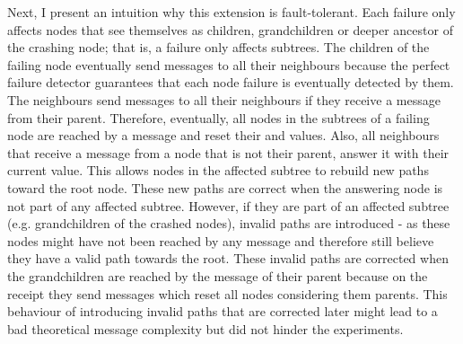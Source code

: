 Next, I present an intuition why this extension is fault-tolerant.
Each failure only affects nodes that see themselves as children, grandchildren or deeper ancestor of the crashing node; that is, a failure only affects subtrees.
The children of the failing node eventually send  messages to all their neighbours because the perfect failure detector guarantees that each node failure is eventually detected by them.
The neighbours send  messages to all their neighbours if they receive a  message from their parent.
Therefore, eventually, all nodes in the subtrees of a failing node are reached by a  message and reset their  and  values.
Also, all neighbours that receive a  message from a node that is not their parent, answer it with their current  value.
This allows nodes in the affected subtree to rebuild new paths toward the root node.
These new paths are correct when the answering node is not part of any affected subtree.
However, if they are part of an affected subtree (e.g. grandchildren of the crashed nodes), invalid paths are introduced - as these nodes might have not been reached by any  message and therefore still believe they have a valid path towards the root.
These invalid paths are corrected when the grandchildren are reached by the  message of their parent because on the receipt they send  messages which reset all nodes considering them parents.
This behaviour of introducing invalid paths that are corrected later might lead to a bad theoretical message complexity but did not hinder the experiments.

